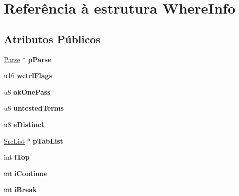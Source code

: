 \hypertarget{struct_where_info}{\section{Referência à estrutura Where\-Info}
\label{struct_where_info}
}
\subsection*{Atributos Públicos}
\begin{DoxyCompactItemize}
\item 
\hypertarget{struct_where_info_a26745055cd13360536fb4b074db358f9}{\hyperlink{struct_parse}{Parse} $\ast$ {\bfseries p\-Parse}}\label{struct_where_info_a26745055cd13360536fb4b074db358f9}

\item 
\hypertarget{struct_where_info_a85ac59be7be01c6b08f8b225585d27e0}{u16 {\bfseries wctrl\-Flags}}\label{struct_where_info_a85ac59be7be01c6b08f8b225585d27e0}

\item 
\hypertarget{struct_where_info_a851aa1747f940f6ab58505f9326fe9c7}{u8 {\bfseries ok\-One\-Pass}}\label{struct_where_info_a851aa1747f940f6ab58505f9326fe9c7}

\item 
\hypertarget{struct_where_info_a4f925cad7a0a9ff977eef944969673d8}{u8 {\bfseries untested\-Terms}}\label{struct_where_info_a4f925cad7a0a9ff977eef944969673d8}

\item 
\hypertarget{struct_where_info_a3dd0b1738e0e2fbf5ab61c00939ab532}{u8 {\bfseries e\-Distinct}}\label{struct_where_info_a3dd0b1738e0e2fbf5ab61c00939ab532}

\item 
\hypertarget{struct_where_info_a0f43432aeca75640c96a69f6a82aa138}{\hyperlink{struct_src_list}{Src\-List} $\ast$ {\bfseries p\-Tab\-List}}\label{struct_where_info_a0f43432aeca75640c96a69f6a82aa138}

\item 
\hypertarget{struct_where_info_a4edc0a92a162cbe63ac8f52e923fb038}{int {\bfseries i\-Top}}\label{struct_where_info_a4edc0a92a162cbe63ac8f52e923fb038}

\item 
\hypertarget{struct_where_info_a5b8eb73a6a5bba7ef126b9de13ee8537}{int {\bfseries i\-Continue}}\label{struct_where_info_a5b8eb73a6a5bba7ef126b9de13ee8537}

\item 
\hypertarget{struct_where_info_a338ac73b84c81db455ad7db56b5e4a06}{int {\bfseries i\-Break}}\label{struct_where_info_a338ac73b84c81db455ad7db56b5e4a06}


\end{DoxyCompactItemize}
